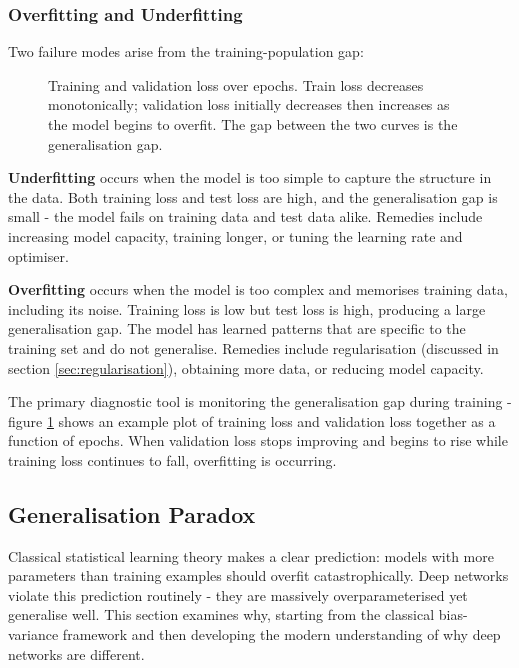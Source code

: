 \subsubsection{Overfitting and Underfitting}

Two failure modes arise from the training-population gap:

\begin{figure}
\centering
{}
\resizebox{0.36\textwidth}{!}{}
\caption{Training and validation loss over epochs. Train loss decreases monotonically; validation loss initially decreases then increases as the model begins to overfit. The gap between the two curves is the generalisation gap.}
\label{fig:overfit_underfit}
\end{figure}

\textbf{Underfitting} occurs when the model is too simple to capture the structure in the data. Both training loss and test loss are high, and the generalisation gap is small - the model fails on training data and test data alike. Remedies include increasing model capacity, training longer, or tuning the learning rate and optimiser.

\textbf{Overfitting} occurs when the model is too complex and memorises training data, including its noise. Training loss is low but test loss is high, producing a large generalisation gap. The model has learned patterns that are specific to the training set and do not generalise. Remedies include regularisation (discussed in section \ref{sec:regularisation}), obtaining more data, or reducing model capacity.

The primary diagnostic tool is monitoring the generalisation gap during training - figure \ref{fig:overfit_underfit} shows an example plot of training loss and validation loss together as a function of epochs. When validation loss stops improving and begins to rise while training loss continues to fall, overfitting is occurring.


\subsection{Generalisation Paradox}

Classical statistical learning theory makes a clear prediction: models with more parameters than training examples should overfit catastrophically. Deep networks violate this prediction routinely - they are massively overparameterised yet generalise well. This section examines why, starting from the classical bias-variance framework and then developing the modern understanding of why deep networks are different.

